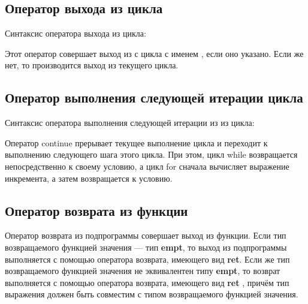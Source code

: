 \documentclass[10pt]{report}
\begin{document}
    \subsection{Оператор выхода из цикла}

Синтаксис оператора выхода из цикла:
\begin{center}
\textcolor{Green}{}
\end{center}
Этот оператор совершает выход из с цикла с именем \textcolor{Green}{}, если оно указано. Если же нет, то производится выход из текущего цикла.
 \subsection{Оператор выполнения следующей итерации цикла}
 
Синтаксис оператора выполнения следующей итерации из из цикла:
\begin{center}
\textcolor{Green}{}
\end{center}
Оператор continue прерывает текущее выполнение цикла и переходит к выполнению следующего шага этого цикла. При этом, цикл while возвращается непосредственно к своему условию, а цикл for сначала вычисляет выражение инкремента, а затем возвращается к условию.
    \subsection{Оператор возврата из функции}
Оператор возврата из подпрограммы совершает выход из функции. Если тип возвращаемого функцией значения --- тип \textbf{empt}, то выход из подпрограммы выполняется
с помощью оператора возврата, имеющего вид \textbf{ret}. Если же тип возвращаемого функцией значения не эквивалентен типу \textbf{empt}, то возврат выполняется
с помощью оператора возврата, имеющего вид \textbf{ret} \textcolor{Green}{}, причём тип выражения должен быть совместим с типом
возвращаемого функцией значения.
         
\end{document}
